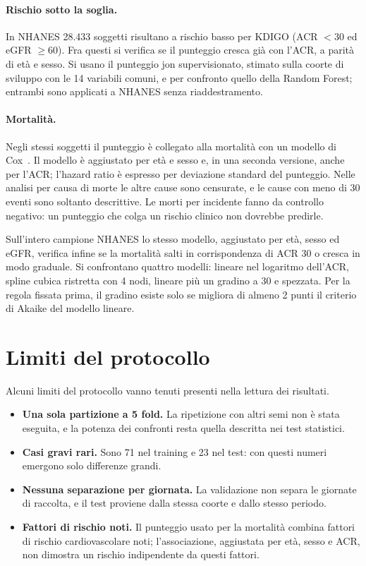 \documentclass[a4paper, 12pt, oneside]{book}
\begin{document}
\paragraph{Rischio sotto la soglia.} In NHANES 28.433 soggetti risultano a rischio basso per KDIGO (ACR $< 30$ ed eGFR $\geq 60$). Fra questi si verifica se il punteggio cresca già con l'ACR, a parità di età e sesso. Si usano il punteggio jon supervisionato, stimato sulla coorte di sviluppo con le 14 variabili comuni, e per confronto quello della Random Forest; entrambi sono applicati a NHANES senza riaddestramento.

\paragraph{Mortalità.} Negli stessi soggetti il punteggio è collegato alla mortalità con un modello di Cox~\cite{cox_regression_1972}. Il modello è aggiustato per età e sesso e, in una seconda versione, anche per l'ACR; l'hazard ratio è espresso per deviazione standard del punteggio. Nelle analisi per causa di morte le altre cause sono censurate, e le cause con meno di 30 eventi sono soltanto descrittive. Le morti per incidente fanno da controllo negativo: un punteggio che colga un rischio clinico non dovrebbe predirle.

Sull'intero campione NHANES lo stesso modello, aggiustato per età, sesso ed eGFR, verifica infine se la mortalità salti in corrispondenza di ACR 30 o cresca in modo graduale. Si confrontano quattro modelli: lineare nel logaritmo dell'ACR, spline cubica ristretta con 4 nodi, lineare più un gradino a 30 e spezzata. Per la regola fissata prima, il gradino esiste solo se migliora di almeno 2 punti il criterio di Akaike del modello lineare.

\section{Limiti del protocollo}

Alcuni limiti del protocollo vanno tenuti presenti nella lettura dei risultati.
\begin{itemize}
	\item \textbf{Una sola partizione a 5 fold.} La ripetizione con altri semi non è stata eseguita, e la potenza dei confronti resta quella descritta nei test statistici.
	\item \textbf{Casi gravi rari.} Sono 71 nel training e 23 nel test: con questi numeri emergono solo differenze grandi.
	\item \textbf{Nessuna separazione per giornata.} La validazione non separa le giornate di raccolta, e il test proviene dalla stessa coorte e dallo stesso periodo.
	\item \textbf{Fattori di rischio noti.} Il punteggio usato per la mortalità combina fattori di rischio cardiovascolare noti; l'associazione, aggiustata per età, sesso e ACR, non dimostra un rischio indipendente da questi fattori.
\end{itemize}
\end{document}
